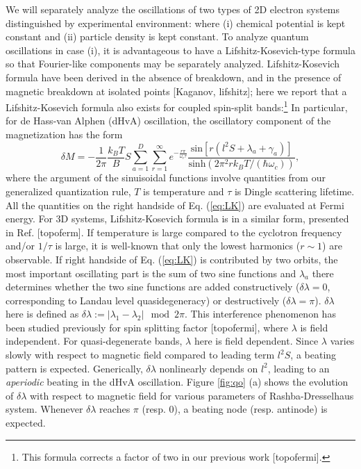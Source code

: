 \documentclass[aps, prb, showpacs, twocolumn, notitlepage, superscriptaddress]{revtex4-1}
\begin{document}
We will separately analyze the oscillations of two types of 2D electron systems distinguished by experimental environment: where (i) chemical potential is kept constant and (ii) particle density is kept constant. To analyze quantum oscillations in case (i), it is advantageous to have a Lifshitz-Kosevich-type formula so that Fourier-like components may be separately analyzed. Lifshitz-Kosevich formula have been derived in the absence of breakdown, and in the presence of magnetic breakdown at isolated points [Kaganov, lifshitz]; here we report that a Lifshitz-Kosevich formula also exists for coupled spin-split bands:\footnote{This formula corrects a factor of two in our previous work [topofermi].} In particular, for de Hass-van Alphen (dHvA) oscillation, the oscillatory component of the magnetization has the form
\begin{equation}
\delta M=-\frac{1}{2\pi}\frac{k_BT}{B}S\sum_{a=1}^D\sum_{r=1}^{\infty}e^{-\frac{r\pi}{\omega_c\tau}}\frac{\text{sin}[r(l^2S+\lambda_a+\gamma_a)]}{\text{sinh}(2\pi^2rk_BT/(\hbar\omega_c))},\label{eq:LK}
\end{equation}
where the argument of the sinuisoidal functions involve quantities from our generalized quantization rule, $T$ is temperature and $\tau$ is Dingle scattering lifetime. All the quantities on the right handside of Eq. (\ref{eq:LK}) are evaluated at Fermi energy. For 3D systems, Lifshitz-Kosevich formula is in a similar form, presented in Ref. [topoferm]. If temperature is large compared to the cyclotron frequency and/or $1/\tau$ is large, it is well-known that only the lowest harmonics ($r\sim 1$) are observable. If right handside of Eq. (\ref{eq:LK}) is contributed by two orbits, the most important oscillating part is the sum of two sine functions and $\lambda_a$ there determines whether the two sine functions are added constructively ($\delta \lambda=0$, corresponding to Landau level quasidegeneracy) or destructively ($\delta\lambda=\pi$). $\delta\lambda$ here is defined as $\delta\lambda:=|\lambda_1-\lambda_2| \mod 2\pi$. This interference phenomenon has been studied previously for spin splitting factor [topofermi], where $\lambda$ is field independent. For quasi-degenerate bands, $\lambda$ here is field dependent. Since $\lambda$ varies slowly with respect to magnetic field compared to leading term $l^2S$, a beating pattern is expected. Generically, $\delta \lambda$ nonlinearly depends on $l^2$, leading to an \textit{aperiodic} beating in the dHvA oscillation. Figure \ref{fig:qo} (a) shows the evolution of $\delta\lambda$ with respect to magnetic field for various parameters of Rashba-Dresselhaus system. Whenever $\delta\lambda$ reaches $\pi$ (resp. $0$), a beating node (resp. antinode) is expected. 
\end{document}
